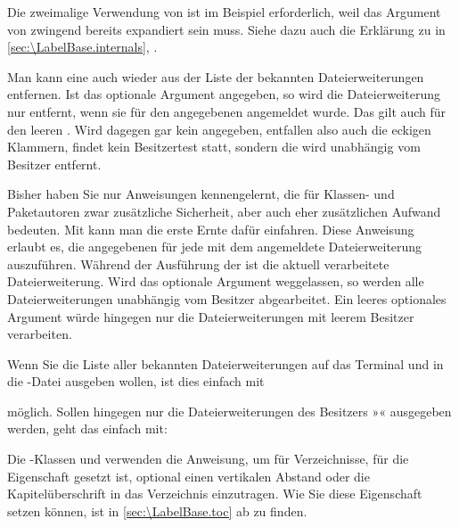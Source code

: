 Die zweimalige Verwendung von  ist im
Beispiel erforderlich, weil das Argument von
 zwingend bereits expandiert
sein muss. Siehe dazu auch die Erklärung zu
 in
\autoref{sec:\LabelBase.internals},
.
%
\EndIndexGroup


\begin{Declaration}
\end{Declaration}
Man kann eine  auch wieder aus der Liste der bekannten
Dateierweiterungen entfernen. Ist das optionale Argument 
angegeben, so wird die Dateierweiterung nur entfernt, wenn sie für den
angegebenen  angemeldet wurde. Das gilt auch für den leeren
. Wird dagegen gar kein  angegeben,
entfallen also auch die eckigen Klammern, findet kein Besitzertest statt,
sondern die  wird unabhängig vom Besitzer entfernt.%
\EndIndexGroup


\begin{Declaration}
\end{Declaration}
Bisher haben Sie nur Anweisungen kennengelernt, die für Klassen- und
Paketautoren zwar zusätzliche Sicherheit, aber auch eher zusätzlichen Aufwand
bedeuten. Mit  kann man die erste Ernte dafür
einfahren. Diese Anweisung erlaubt es, die angegebenen  für
jede mit dem  angemeldete Dateierweiterung
auszuführen. Während der Ausführung der  ist
 die aktuell
verarbeitete Dateierweiterung. Wird das optionale Argument
 weggelassen, so werden alle Dateierweiterungen
unabhängig vom Besitzer abgearbeitet. Ein leeres optionales Argument würde
hingegen nur die Dateierweiterungen mit leerem Besitzer verarbeiten.
\begin{Example}
  Wenn Sie die Liste aller bekannten Dateierweiterungen auf das Terminal und
  in die -Datei ausgeben wollen, ist dies einfach mit
\begin{lstcode}
  \doforeachtocfile{\typeout{\@currext}}
\end{lstcode}
  möglich. Sollen hingegen nur die Dateierweiterungen des Besitzers
  »« ausgegeben werden, geht das einfach mit:
\begin{lstcode}
  \doforeachtocfile[foo]{\typeout{\@currext}}
\end{lstcode}
\end{Example}
Die \KOMAScript-Klassen  und  verwenden die
Anweisung, um für Verzeichnisse, für die Eigenschaft 
gesetzt ist, optional einen vertikalen Abstand oder die Kapitelüberschrift in
das Verzeichnis einzutragen. Wie Sie diese Eigenschaft setzen können, ist
in \autoref{sec:\LabelBase.toc} ab  zu
finden.%
\EndIndexGroup



